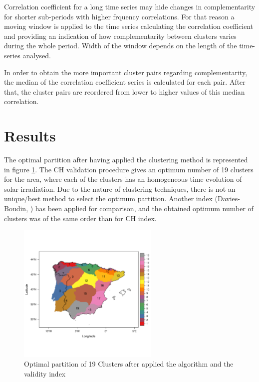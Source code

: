 Correlation coefficient for a long time series may hide changes in complementarity for shorter sub-periods with higher frquency correlations. For that reason a moving window is applied to the time series calculating the correlation coefficient and providing an indication of how complementarity between clusters varies during the whole period. Width of the window depends on the length of the time-series analysed.

In order to obtain the more important cluster pairs regarding complementarity, the median of the correlation coefficient series is calculated for each pair. After that, the cluster pairs are reordered from lower to higher values of this median correlation.
 

\section{Results}

The optimal partition after having applied the clustering method is represented in figure \ref{clusters}. The CH validation procedure gives an optimum number of 19 clusters for the area, where each of the clusters has an homogeneous time evolution of solar irradiation. Due to the nature of clustering techniques, there is not an unique/best method to select the optimum partition. Another index (Davies-Boudin, \cite{davies1979cluster}) has been applied for comparison, and the obtained optimum number of clusters was of the same order than for CH index.
 
\begin{figure}[h!]
\centering\includegraphics[width=0.6\textwidth]{figs/capitulo5/clusters2}
\caption{Optimal partition of 19 Clusters after applied the algorithm and the validity index}
\label{clusters}
\end{figure}

